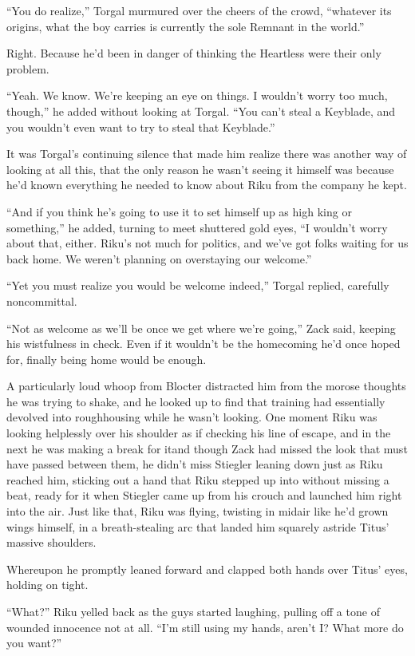 ``You do realize,'' Torgal murmured over the cheers of the crowd, ``whatever its origins, what the boy carries is currently the sole Remnant in the world.''

Right. Because he'd been in danger of thinking the Heartless were their only problem.

``Yeah. We know. We're keeping an eye on things. I wouldn't worry too much, though,'' he added without looking at Torgal. ``You can't steal a Keyblade, and you wouldn't even want to try to steal that Keyblade.''

It was Torgal's continuing silence that made him realize there was another way of looking at all this, that the only reason he wasn't seeing it himself was because he'd known everything he needed to know about Riku from the company he kept.

``And if you think he's going to use it to set himself up as high king or something,'' he added, turning to meet shuttered gold eyes, ``I wouldn't worry about that, either. Riku's not much for politics, and we've got folks waiting for us back home. We weren't planning on overstaying our welcome.''

``Yet you must realize you would be welcome indeed,'' Torgal replied, carefully noncommittal.

``Not as welcome as we'll be once we get where we're going,'' Zack said, keeping his wistfulness in check. Even if it wouldn't be the homecoming he'd once hoped for, finally being home would be enough.

A particularly loud whoop from Blocter distracted him from the morose thoughts he was trying to shake, and he looked up to find that training had essentially devolved into roughhousing while he wasn't looking. One moment Riku was looking helplessly over his shoulder as if checking his line of escape, and in the next he was making a break for it\textemdash and though Zack had missed the look that must have passed between them, he didn't miss Stiegler leaning down just as Riku reached him, sticking out a hand that Riku stepped up into without missing a beat, ready for it when Stiegler came up from his crouch and launched him right into the air. Just like that, Riku was flying, twisting in midair like he'd grown wings himself, in a breath-stealing arc that landed him squarely astride Titus' massive shoulders.

Whereupon he promptly leaned forward and clapped both hands over Titus' eyes, holding on tight.

``What?'' Riku yelled back as the guys started laughing, pulling off a tone of wounded innocence not at all. ``I'm still using my hands, aren't I? What more do you want?''

